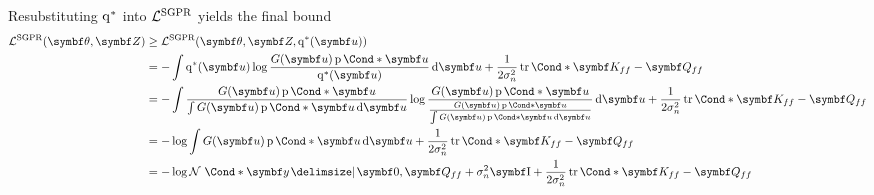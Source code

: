 Resubstituting $\operatorname{q}^\ast$ into $\mathcal{L}^{\text{SGPR}}$ yields the final bound
\begin{align}
    \begin{split}
        \Lc^{\text{SGPR}}(\mat{\theta}, \mat{Z})
        &\geq \Lc^{\text{SGPR}}(\mat{\theta}, \mat{Z}, \q^\ast(\mat{u})) \\
        &= -\int \q^\ast(\mat{u}) \log\frac{G(\mat{u})\Prob*{\mat{u}}}{\q^\ast(\mat{u})} \diff \mat{u} + \frac{1}{2\sigma_n^2}\Fun*{\tr}{\mat{K_{ff}} - \mat{Q_{ff}}} \\
        &= -\int \frac{G(\mat{u}) \Prob*{\mat{u}}}{\int G(\mat{u}) \Prob*{\mat{u}} \diff \mat{u}} \log\frac{G(\mat{u})\Prob*{\mat{u}}}{\frac{G(\mat{u}) \Prob*{\mat{u}}}{\int G(\mat{u}) \Prob*{\mat{u}} \diff \mat{u}}} \diff \mat{u} + \frac{1}{2\sigma_n^2}\Fun*{\tr}{\mat{K_{ff}} - \mat{Q_{ff}}} \\
        &= -\log \int G(\mat{u}) \Prob*{\mat{u}} \diff \mat{u} + \frac{1}{2\sigma_n^2}\Fun*{\tr}{\mat{K_{ff}} - \mat{Q_{ff}}} \\
        &= -\log \Gaussian*{\mat{y} \given \mat{0}, \mat{Q_{ff}} + \sigma_n^2\Eye} + \frac{1}{2\sigma_n^2}\Fun*{\tr}{\mat{K_{ff}} - \mat{Q_{ff}}}
    \end{split}
\end{align}

